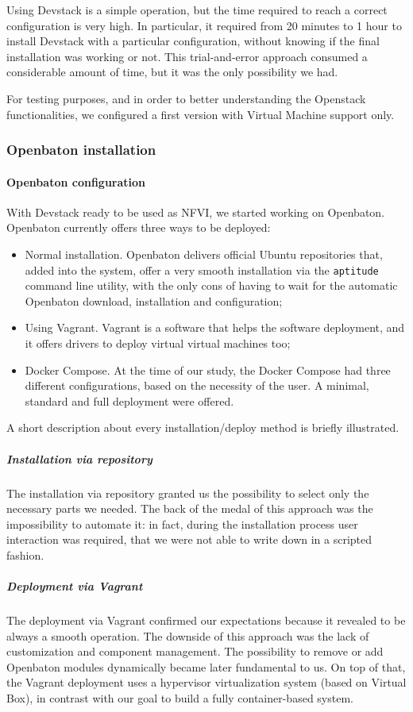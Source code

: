 Using Devstack is a simple operation, but the time required to reach a correct 
configuration is very high. In particular, it required from 20 minutes to 1 
hour to install Devstack with a particular configuration, without knowing if the 
final installation was working or not. This trial-and-error approach consumed a 
considerable amount of time, but it was the only possibility we had.

For testing purposes, and in order to better understanding the Openstack
functionalities, we configured a first version with Virtual Machine support
only.

\subsubsection{Openbaton installation}
\paragraph*{Openbaton configuration}
With Devstack ready to be used as NFVI, we started working on Openbaton.
Openbaton currently offers three ways to be deployed:
\begin{itemize}
  \item Normal installation. Openbaton delivers official Ubuntu repositories
    that, added into the system, offer a very smooth installation via the
    \verb!aptitude! command line utility, with the only cons of having to wait
    for the automatic Openbaton download, installation and configuration;
  \item Using Vagrant. Vagrant is a software that helps the software deployment,
    and it offers drivers to deploy virtual virtual machines too;
  \item Docker Compose. At the time of our study, the Docker Compose had three
    different configurations, based on the necessity of the user. A minimal,
    standard and full deployment were offered.
\end{itemize}

A short description about every installation/deploy method is briefly
illustrated.

\subparagraph*{Installation via repository}
The installation via repository granted us the possibility to select only the
necessary parts we needed. The back of the medal of this approach was the
impossibility to automate it: in fact, during the installation process user
interaction was required, that we were not able to write down in a scripted
fashion.

\subparagraph*{Deployment via Vagrant}
The deployment via Vagrant confirmed our expectations because it revealed to be
always a smooth operation. The downside of this approach was the lack of
customization and component management. The possibility to remove or add
Openbaton modules dynamically became later fundamental to us. On top of that,
the Vagrant deployment uses a hypervisor virtualization system (based on Virtual
Box), in contrast with our goal to build a fully container-based system.

